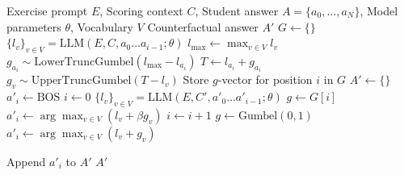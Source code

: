 \begin{algorithm}
\caption{Student Gumbel Noise Recovery and Counterfactual Generation }
\begin{algorithmic}[1]
\REQUIRE Exercise prompt $E$, Scoring context $C$, Student answer $A=\{a_0,\dots,a_N\}$, Model parameters $\theta$, Vocabulary $V$
\ENSURE Counterfactual answer $A'$
\STATE $G \gets \{\}$ 
    \STATE $\{l_v\}_{v\in V} = \text{LLM}(E,C,a_0 \dots a_{i-1};\theta)$
    \STATE $l_{\max} \gets \max_{v\in V} l_v$
    \STATE  $g_{a_i} \sim \text{LowerTruncGumbel}(l_{\max}-l_{a_i})$
    \STATE $T \gets l_{a_i} + g_{a_i}$
        \STATE  $g_v \sim \text{UpperTruncGumbel}(T-l_v)$
    \ENDFOR
    \STATE Store $g$-vector for position $i$ in $G$
\ENDFOR
\STATE $A' \gets \{\}$
\STATE $a'_i \gets \text{BOS}$
\STATE $i \gets 0$
\STATE $\{l_v\}_{v\in V} = \text{LLM}(E,C',a'_0\dots a'_{i-1};\theta)$
    \STATE $g \gets G[i]$
    \STATE $a'_i \gets \arg\max_{v\in V} (l_v + \beta g_v)$
    \STATE $i \gets i + 1$
    \ELSE
    \STATE $g \gets \text{Gumbel}(0,1)$
    \STATE $a'_i \gets \arg\max_{v\in V} (l_v + g_v)$

    \ENDIF
    \STATE Append $a'_i$ to $A'$
\ENDWHILE
\RETURN $A'$
\end{algorithmic}
\end{algorithm}